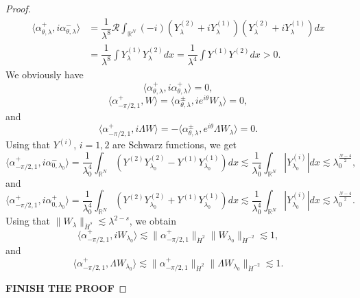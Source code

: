 \documentclass[a4paper,two-side,10pt]{amsart}
\newcommand{\R}{\mathbb{R}}
\numberwithin{equation}{section}
\begin{document}
\begin{proof}
\begin{align*}
\langle \alpha_{\theta ,\lambda}^+, i \alpha_{\theta , \lambda}^- \rangle& = \dfrac{1}{\lambda^8} \mathcal{R} \int_{\R^N} (-i) (Y_\lambda^{(2)} +i Y_{\lambda}^{(1)}) (Y_\lambda^{(2)} +i Y_{\lambda}^{(1)} ) dx\\
& = \dfrac{1}{\lambda^8} \int Y_\lambda^{(1)} Y_\lambda^{(2)} dx=\dfrac{1}{\lambda^4} \int Y^{(1)} Y^{(2)} dx >0.
\end{align*}
We obviously have
$$\langle \alpha_{\theta , \lambda}^+, i \alpha_{\theta ,\lambda}^+ \rangle =0,$$
$$\langle \alpha_{-\pi /2 , 1}^+ , W \rangle = \langle \alpha_{\theta ,\lambda}^\pm , ie^{i\theta} W_\lambda \rangle =0,$$
and
$$\langle  \alpha_{-\pi /2 , 1}^+ , i \Lambda W \rangle = -\langle \alpha_{\theta ,\lambda}^\pm , e^{i\theta}\Lambda W_\lambda \rangle =0 .$$
Using that $Y^{(i)}$, $i=1,2$ are Schwarz functions, we get
$$\langle \alpha_{-\pi /2 , 1}^+ , i \alpha_{0 , \lambda_0}^- \rangle =  \dfrac{1}{\lambda_0^4} \int_{\R^N} (Y^{(2)} Y^{(2)}_{\lambda_0} - Y^{(1)} Y^{(1)}_{\lambda_0} ) dx \lesssim \dfrac{1}{\lambda_0^4} \int_{\R^N} |Y^{(i)}_{\lambda_0}| dx \lesssim\lambda_0^{\frac{N-4}{2}} ,$$
and
$$ \langle \alpha_{-\pi /2 , 1}^+ , i \alpha_{0 , \lambda_0}^+ \rangle =  \dfrac{1}{\lambda_0^4} \int_{\R^N} (Y^{(2)} Y^{(2)}_{\lambda_0} + Y^{(1)} Y^{(1)}_{\lambda_0} ) dx \lesssim \dfrac{1}{\lambda_0^4} \int_{\R^N} |Y^{(i)}_{\lambda_0}| dx \lesssim \lambda_0^{\frac{N-4}{2}}.  $$
Using that $\|W_\lambda\|_{\dot{H}^s} \lesssim \lambda^{2-s}$, we obtain
$$ \langle \alpha_{-\pi /2 , 1}^+ , i W_{\lambda_0} \rangle \lesssim \| \alpha_{-\pi /2 , 1}^+ \|_{\dot{H}^2} \|W_{\lambda_0}\|_{\dot{H}^{-2}} \lesssim 1 ,$$
and
$$ \langle \alpha_{-\pi /2 , 1}^+ ,  \Lambda W_{\lambda_0} \rangle  \lesssim \| \alpha_{-\pi /2 , 1}^+ \|_{\dot{H}^2} \|\Lambda W_{\lambda_0}\|_{\dot{H}^{-2}} \lesssim 1 .$$

{\bf FINISH THE PROOF}




\end{proof}
\end{document}
